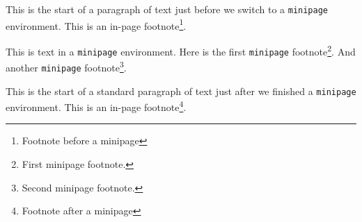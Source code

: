 \documentclass{article}
\begin{document}
	This is the start of a paragraph of text just before we switch to a \texttt{minipage} environment. This is an in-page footnote\footnote{Footnote before a minipage}.
	
	\vspace{10pt}
	\begin{minipage}{0.7\textwidth}
		This is text in a \texttt{minipage} environment. Here is the first \texttt{minipage} footnote\footnote{First minipage footnote.}. And another \texttt{minipage} footnote\footnote{Second minipage footnote.}.
	\end{minipage}
	\vspace{10pt}
	
	This is the start of a standard paragraph of text just after we finished a \texttt{minipage} environment. This is an in-page footnote\footnote{Footnote after a minipage}.
\end{document}
